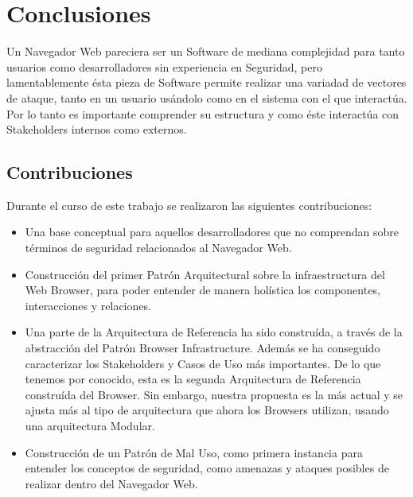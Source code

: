 \chapter{Conclusiones}
\label{chap7:concl}

Un Navegador Web pareciera ser un Software de mediana complejidad para tanto usuarios como desarrolladores sin experiencia en Seguridad, pero lamentablemente ésta pieza de Software permite realizar una variadad de vectores de ataque, tanto en un usuario usándolo como en el sistema con el que interactúa. Por lo tanto es importante comprender su estructura y como éste interactúa con Stakeholders internos como externos.


\section{Contribuciones}
Durante el curso de este trabajo se realizaron las siguientes contribuciones:
\begin{itemize}
	\item Una base conceptual para aquellos desarrolladores que no comprendan sobre términos de seguridad relacionados al Navegador Web.
	\item Construcción del primer Patrón Arquitectural sobre la infraestructura del Web Browser, para poder entender de manera holística los componentes, interacciones y relaciones.
	\item Una parte de la Arquitectura de Referencia ha sido construída, a través de la abstracción del Patrón Browser Infrastructure. Además se ha conseguido caracterizar los Stakeholders y Casos de Uso más importantes. De lo que tenemos por conocido, esta es la segunda Arquitectura de Referencia construída del Browser. Sin embargo, nuestra propuesta es la más actual y se ajusta más al tipo de arquitectura que ahora los Browsers utilizan, usando una arquitectura Modular.
	\item Construcción de un Patrón de Mal Uso, como primera instancia para entender los conceptos de seguridad, como amenazas y ataques posibles de realizar dentro del Navegador Web.
\end{itemize}

